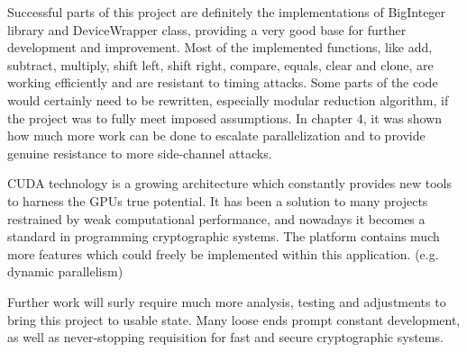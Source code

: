 \documentclass[oneside,openright,12pt,final,en]{mgr}
\begin{document}
Successful parts of this project are definitely the implementations of BigInteger library and DeviceWrapper class, providing a very good base for further development and improvement. Most of the implemented functions, like add, subtract, multiply, shift left, shift right, compare, equals, clear and clone, are working efficiently and are resistant to timing attacks. Some parts of the code would certainly need to be rewritten, especially modular reduction algorithm, if the project was to fully meet imposed assumptions. In chapter 4, it was shown how much more work can be done to escalate parallelization and to provide genuine resistance to more side-channel attacks.

CUDA technology is a growing architecture which constantly provides new tools to harness the GPUs true potential.
It has been a solution to many projects restrained by weak computational performance, and nowadays it becomes a standard in programming cryptographic systems. The platform contains much more features which could freely be implemented within this application. (e.g. dynamic parallelism\cite{dp})

Further work will surly require much more analysis, testing and adjustments to bring this project to usable state. Many loose ends prompt constant development, as well as never-stopping requisition for fast and secure cryptographic systems. 


\nocite{*}

 \listoffigures
 \listoftables
\end{document}

